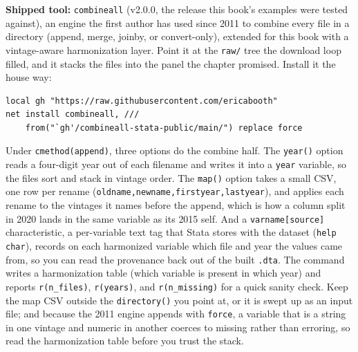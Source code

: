 \documentclass[
    a4paper,
    fontsize=10pt,
    twoside=true,
    numbers=noenddot,
]{kaobook}
\begin{document}
\begin{kaobox}[frametitle=Package Integration: \texttt{combineall}]
\textbf{Shipped tool:} \texttt{combineall} (v2.0.0, the release this book's examples were tested against), an engine the first author has used since 2011 to combine every file in a directory (append, merge, joinby, or convert-only), extended for this book with a vintage-aware harmonization layer. Point it at the \texttt{raw/} tree the download loop filled, and it stacks the files into the panel the chapter promised. Install it the house way:
\par
{\footnotesize
\begin{verbatim}
local gh "https://raw.githubusercontent.com/ericabooth"
net install combineall, ///
    from("`gh'/combineall-stata-public/main/") replace force
\end{verbatim}
}
Under \texttt{cmethod(append)}, three options do the combine half. The \texttt{year()} option reads a four-digit year out of each filename and writes it into a \texttt{year} variable, so the files sort and stack in vintage order. The \texttt{map()} option takes a small CSV, one row per rename (\texttt{oldname,newname,firstyear,lastyear}), and applies each rename to the vintages it names before the append, which is how a column split in 2020 lands in the same variable as its 2015 self. And a \texttt{varname[source]} characteristic, a per-variable text tag that Stata stores with the dataset (\texttt{help char}), records on each harmonized variable which file and year the values came from, so you can read the provenance back out of the built \texttt{.dta}. The command writes a harmonization table (which variable is present in which year) and reports \texttt{r(n\_files)}, \texttt{r(years)}, and \texttt{r(n\_missing)} for a quick sanity check. Keep the map CSV outside the \texttt{directory()} you point at, or it is swept up as an input file; and because the 2011 engine appends with \texttt{force}, a variable that is a string in one vintage and numeric in another coerces to missing rather than erroring, so read the harmonization table before you trust the stack.
\end{kaobox}
\end{document}
